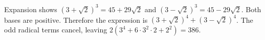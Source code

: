 Expansion shows $(3+\sqrt2)^3=45+29\sqrt2$ and $(3-\sqrt2)^3=45-29\sqrt2$. Both bases are positive. Therefore the expression is $(3+\sqrt2)^4+(3-\sqrt2)^4$. The odd radical terms cancel, leaving $2(3^4+6\cdot3^2\cdot2+2^2)=\boxed{386}$.
